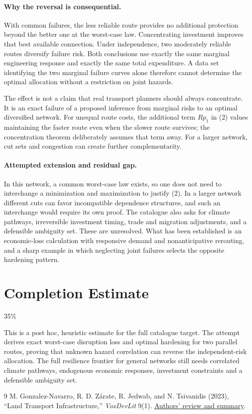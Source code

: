 \documentclass[11pt]{article}
\theoremstyle{definition}
\begin{document}
\paragraph{Why the reversal is consequential.}
With common failures, the less reliable route provides no additional protection beyond the better one at the worst-case law. Concentrating investment improves that best available connection. Under independence, two moderately reliable routes diversify failure risk. Both conclusions use exactly the same marginal engineering response and exactly the same total expenditure. A data set identifying the two marginal failure curves alone therefore cannot determine the optimal allocation without a restriction on joint hazards.

The effect is not a claim that real transport planners should always concentrate. It is an exact failure of a proposed inference from marginal risks to an optimal diversified network. For unequal route costs, the additional term $Rp_1$ in (2) values maintaining the faster route even when the slower route survives; the concentration theorem deliberately assumes that term away. For a larger network, cut sets and congestion can create further complementarity.

\paragraph{Attempted extension and residual gap.}
In this network, a common worst-case law exists, so one does not need to interchange a minimization and maximization to justify (2). In a larger network different cuts can favor incompatible dependence structures, and such an interchange would require its own proof. The catalogue also asks for climate pathways, irreversible investment timing, trade and migration adjustments, and a defensible ambiguity set. These are unresolved. What has been established is an economic-loss calculation with responsive demand and nonanticipative rerouting, and a sharp example in which neglecting joint failures selects the opposite hardening pattern.

\section{Completion Estimate}
35\%

This is a post hoc, heuristic estimate for the full catalogue target.
The attempt derives exact worst-case disruption loss and optimal hardening for two parallel routes, proving that unknown hazard correlation can reverse the independent-risk allocation. The full resilience frontier for general networks still needs correlated climate pathways, endogenous economic responses, investment constraints and a defensible ambiguity set.

\begin{thebibliography}{9}
 M. Gonzalez-Navarro, R. D. Z\'arate, R. Jedwab, and N. Tsivanidis (2023), ``Land Transport Infrastructure,'' \emph{VoxDevLit} 9(1). \href{https://voxdev.org/voxdevlit/land-transport-infrastructure}{Authors' review and summary}.
\end{thebibliography}
\end{document}
